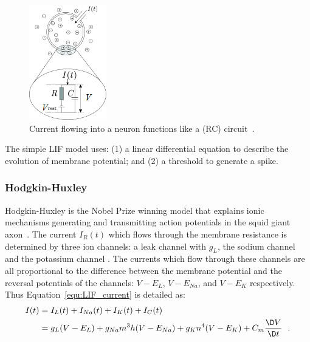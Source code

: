 \begin{figure}[tb!]
	\centering
	\includegraphics[width=0.3\textwidth]{pics_snn/RC.png}
	\caption{Current flowing into a neuron functions like a \DIFdelbeginFL {}\DIFdelendFL \DIFaddbeginFL {}\DIFaddendFL (RC) circuit~\citep{gerstner2014neuronal}.}
	\label{Fig:rc}
\end{figure}
The simple LIF model uses: (1) a linear differential equation to describe the evolution of membrane potential;
and (2) a threshold to generate a spike.

\subsubsection{Hodgkin-Huxley \DIFaddbegin {}\DIFaddend }
\DIFaddbegin {}\DIFaddend Hodgkin-Huxley \DIFaddbegin {}\DIFaddend is the Nobel Prize winning model that explains \DIFaddbegin {}\DIFaddend ionic mechanisms generating and transmitting action potentials in the squid giant axon~\DIFdelbegin {}\DIFdelend \DIFaddbegin {}\DIFaddend .
The current $I_R(t)$ which flows through the membrane resistance is determined by three ion channels: a leak channel with \DIFdelbegin {}\DIFdelend \DIFaddbegin {}\DIFaddend $g_L$, the sodium channel \DIFdelbegin {}\DIFdelend \DIFaddbegin {}\DIFaddend and the potassium channel \DIFdelbegin {}\DIFdelend \DIFaddbegin {}\DIFaddend .
The currents which flow through these channels are all proportional to the difference between the membrane potential and the reversal potentials of the channels: $V-E_L$, $V-E_{Na}$, and $V-E_{K}$ respectively.
Thus Equation~\ref{equ:LIF_current} is detailed as:
\begin{equation}
\begin{aligned}
I(t) &= I_L(t) + I_{Na}(t) + I_{K}(t)+ I_C(t) \\
&= g_L(V-E_L) + g_{Na}m^3h(V-E_{Na}) + g_{K}n^4(V-E_{K})  + C_m \dfrac{\D V}{\D t}~~.
\end{aligned}
\label{equ:HH_current}
\end{equation}
\DIFdelbegin %

